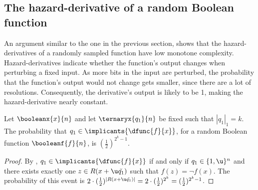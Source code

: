 \documentclass[acmsmall, nonacm, authorversion]{acmart}
\begin{document}
\subsection{The hazard-derivative of a random Boolean function}\label{subsec:hd-random-function}
An argument similar to the one in the previous section, shows that the hazard-derivatives of a randomly sampled function have low monotone complexity. Hazard-derivatives indicate whether the function’s output changes when perturbing a fixed input. As more bits in the input are perturbed, the probability that the function's output would not change gets smaller, since there are a lot of resolutions. Consequently, the derivative's output is likely to be 1, making the hazard-derivative nearly constant. 

\begin{lemma}\label{lem:weight-of-random-pi-df}
Let $\booleanx{x}{n}$ and let $\ternaryx{q_{1}}{n}$ be fixed such that  $|q_{1}|_{1}=k$. The probability that $q_{1}\in \implicants{\dfunc{f}{x}}$, for a random Boolean function  $\booleanf{f}{n}$, is $(\frac{1}{2})^{2^k-1}$.
\end{lemma}
\begin{proof}
By , $q_{1}\in \implicants{\dfunc{f}{x}}$ if and only if $q_1\in \{1,\u\}^n$ and there exists exactly one $z\in R(x+\u\check{q_1})$ such that $f(z)=\neg f(x)$. The probability of this event is $2\cdot (\frac{1}{2})^{|R(x+\u\check{q_1})|}=2\cdot (\frac{1}{2})^{2^k}=(\frac{1}{2})^{2^k-1}$.
\end{proof}
\end{document}
